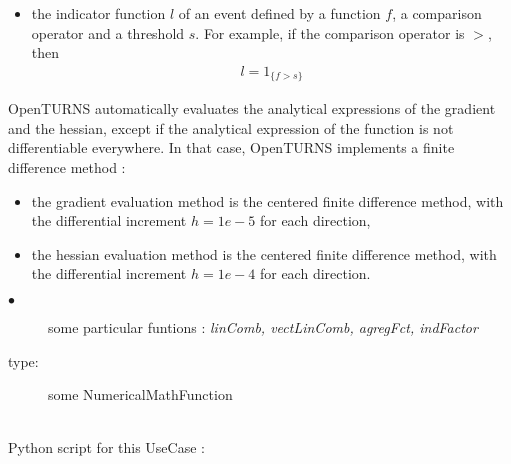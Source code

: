 \begin{itemize}
\item the indicator function $l$ of an event defined by a function $f$, a comparison operator and a threshold $s$. For example, if the comparison operator is $>$, then
  \begin{align*}
    l = 1_{\{f > s\}}
  \end{align*}
\end{itemize}


OpenTURNS automatically evaluates the analytical expressions of the gradient and the hessian, except if the analytical expression of the function is not differentiable everywhere. In that case, OpenTURNS implements a finite difference method :
\begin{itemize}
\item the gradient evaluation method is the centered finite difference method, with the differential increment $h=1e-5$ for each direction,
\item the hessian evaluation method is the centered finite difference method, with the differential increment $h=1e-4$ for each direction.
\end{itemize}

             {
               \begin{description}
               \item[$\bullet$] some particular funtions : {\itshape linComb, vectLinComb, agregFct, indFactor}
               \item[type:] some NumericalMathFunction
               \end{description}
             }

             \textspace\\
             Python script for this UseCase :

